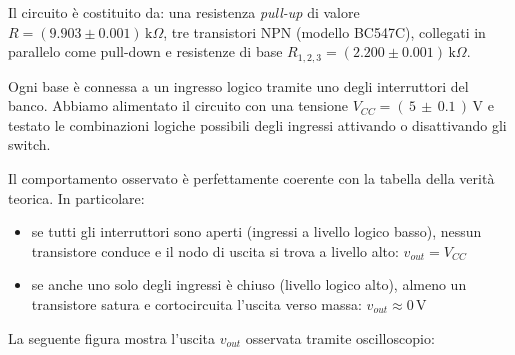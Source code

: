 \documentclass[a4paper,12pt]{article}
\begin{document}
Il circuito è costituito da: una resistenza \textit{pull-up} di valore \(R = (9.903 \pm 0.001)\,\text{k}\Omega\), tre transistori NPN (modello BC547C), collegati in parallelo come pull-down
e resistenze di base \(R_{1,2,3} = (2.200 \pm 0.001)\,\text{k}\Omega\).

Ogni base è connessa a un ingresso logico tramite uno degli interruttori del banco. Abbiamo alimentato il circuito con una tensione \(V_{CC} = (\,5\,\pm\,0.1\,)\,\mathrm{V}\) e testato le combinazioni logiche possibili degli ingressi attivando o disattivando gli switch.

Il comportamento osservato è perfettamente coerente con la tabella della verità teorica. In particolare:
\begin{itemize}
  \item se tutti gli interruttori sono aperti (ingressi a livello logico basso), nessun transistore conduce e il nodo di uscita si trova a livello alto: \(v_{out} = V_{CC}\)
  \item se anche uno solo degli ingressi è chiuso (livello logico alto), almeno un transistore satura e cortocircuita l'uscita verso massa: \(v_{out} \approx 0\,\mathrm{V}\)  
\end{itemize}

La seguente figura mostra l’uscita \(v_{out}\) osservata tramite oscilloscopio:
\end{document}
